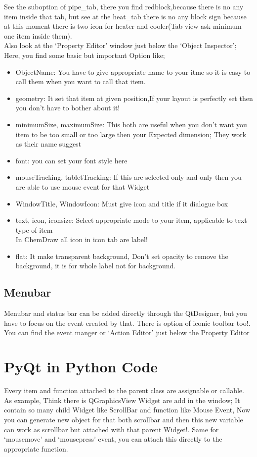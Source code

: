\documentclass[12pt,a4paper,oneside]{book}
\begin{document}
See the suboption of pipe\_{tab}, there you find redblock,because there is no any item inside that tab, but see at the heat\_{tab} there is no any block sign because at this moment there is two icon for heater and cooler(Tab view ask minimum one item inside them).\\
Also look at the `Property Editor' window just below the `Object Inspector'; Here, you find some basic but important Option like;
\begin{itemize}
\item ObjectName: You have to give appropriate name to your itme so it is easy to call them when you want to call that item.
\item geometry: It set that item at given position,If your layout is perfectly set then you don't have to bother about it!
\item minimumSize, maximumSize: This both are useful when you don't want you item to be too small or too large then your Expected dimension; They work as their name suggest
\item font: you can set your font style here
\item mouseTracking, tabletTracking: If this are selected only and only then you are able to use mouse event for that Widget
\item WindowTitle, WindowIcon: Must give icon and title if it dialogue box
\item text, icon, iconsize: Select appropriate mode to your item, applicable to text type of item\\
In ChemDraw all icon in icon tab are label!
\item flat: It make transparent background, Don't set opacity to remove the background, it is for whole label not for background.
\end{itemize}
\section{Menubar}
Menubar and status bar can be added directly through the QtDesigner, but you have to focus on the event created by that. There is option of iconic toolbar too!. You can find the event manger or `Action Editor' just below the Property Editor
\chapter{PyQt in Python Code}
Every item and function attached to the parent class are assignable or callable. As example, Think there is QGraphicsView Widget are add in the window; It contain so many child Widget like ScrollBar and function like Mouse Event, Now you can generate new object for that both scrollbar and then this new variable can work as scrollbar but attached with that parent Widget!. Same for `mousemove' and `mousepress' event, you can attach this directly to the appropriate function.
\end{document}
